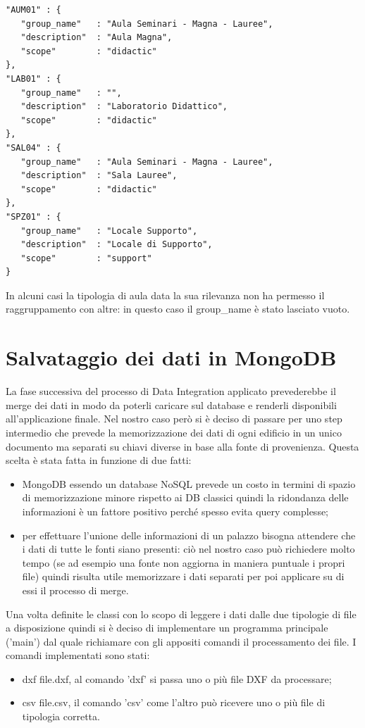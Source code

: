 \documentclass[12pt]{report}
\begin{document}
\begin{lstlisting}[label=codice,caption=Esempio delle categorie di stanze memorizzate in "'room\_category.json'", frame=single]
"AUM01" : {
   "group_name"   : "Aula Seminari - Magna - Lauree",
   "description"  : "Aula Magna",
   "scope"        : "didactic"
},
"LAB01" : {
   "group_name"   : "",
   "description"  : "Laboratorio Didattico",
   "scope"        : "didactic"
},
"SAL04" : {
   "group_name"   : "Aula Seminari - Magna - Lauree",
   "description"  : "Sala Lauree",
   "scope"        : "didactic"
},
"SPZ01" : {
   "group_name"   : "Locale Supporto",
   "description"  : "Locale di Supporto",
   "scope"        : "support"
}
\end{lstlisting}

In alcuni casi la tipologia di aula data la sua rilevanza non ha permesso il raggruppamento con altre: in questo caso il group\_name è stato lasciato vuoto. 


\newpage
\section{Salvataggio dei dati in MongoDB}

La fase successiva del processo di Data Integration applicato prevederebbe il merge dei dati in modo da poterli caricare sul database e renderli disponibili all'applicazione finale.
Nel nostro caso però si è deciso di passare per uno step intermedio che prevede la memorizzazione dei dati di ogni edificio in un unico documento ma separati su chiavi diverse in base alla fonte di provenienza.
Questa scelta è stata fatta in funzione di due fatti:
\begin{itemize}
\item MongoDB essendo un database NoSQL prevede un costo in termini di spazio di memorizzazione minore rispetto ai DB classici quindi la ridondanza delle informazioni è un fattore positivo perché spesso evita query complesse;
\item per effettuare l'unione delle informazioni di un palazzo bisogna attendere che i dati di tutte le fonti siano presenti: ciò nel nostro caso può richiedere molto tempo (se ad esempio una fonte non aggiorna in maniera puntuale i propri file) quindi risulta utile memorizzare i dati separati per poi applicare su di essi il processo di merge.     
\end{itemize}

Una volta definite le classi con lo scopo di leggere i dati dalle due tipologie di file a disposizione quindi si è deciso di implementare un programma principale ('main') dal quale richiamare con gli appositi comandi il processamento dei file.
I comandi implementati sono stati:
\begin{itemize}
\item dxf file.dxf, al comando 'dxf' si passa uno o più file DXF da processare;
\item csv file.csv, il comando 'csv' come l'altro può ricevere uno o più file di tipologia corretta. 
\end{itemize}
\end{document}
